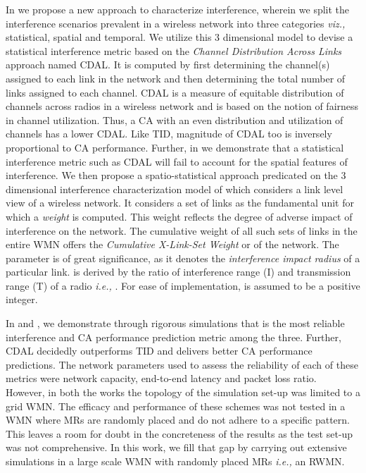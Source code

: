 \documentclass[conference]{IEEEtran}
\begin{document}
In \cite{Manas3} we propose a new approach to characterize interference, wherein we split the interference scenarios prevalent in a wireless network into three categories \textit{viz.,} statistical, spatial and temporal. We utilize this 3 dimensional model to devise a statistical interference metric based on the \textit{Channel Distribution Across Links} approach named CDAL. It is computed by first determining the channel(s) assigned to each link in the network and then determining the total number of links assigned to each channel. CDAL is a measure of equitable distribution of channels across radios in a wireless network and is based on the notion of fairness in channel utilization. Thus, a CA with an even distribution and utilization of channels has a lower CDAL. Like TID, magnitude of CDAL too is inversely proportional to CA performance. Further, in \cite{Manas4} we demonstrate that a statistical interference metric such as CDAL will fail to account for the 
spatial features of interference. We then propose a spatio-statistical approach predicated on the 3 dimensional interference characterization model of \cite{Manas3} which considers a link level view of a wireless network. It considers a set of  links as the fundamental unit for which a \textit{weight} is computed. This weight reflects the degree of adverse impact of interference on the network. The cumulative weight of all such sets of  links in the entire WMN offers the \textit{Cumulative X-Link-Set Weight} or  of the network. The parameter  is of great significance, as it denotes the \textit{interference impact radius} of a particular link.  is derived by the ratio of interference range (I) and transmission range (T) of a radio \emph{i.e.,} . For ease of implementation,  is assumed to be a positive integer. 

In \cite{Manas3} and \cite{Manas4}, we demonstrate through rigorous simulations that  is the most reliable interference and CA performance prediction metric among the three. Further, CDAL decidedly outperforms TID and delivers better CA performance predictions. The network parameters used to assess the reliability of each of these metrics were network capacity, end-to-end latency and packet loss ratio.\\
However, in both the works the topology of the simulation set-up was limited to a grid WMN. The efficacy and performance of these schemes was not tested in a WMN where MRs are randomly placed and do not adhere to a specific pattern. This leaves a room for doubt in the concreteness of the results as the test set-up was not comprehensive. In this work, we fill that gap by carrying out extensive simulations in a large scale WMN with randomly placed MRs \emph{i.e.,} an RWMN. 
\end{document}
